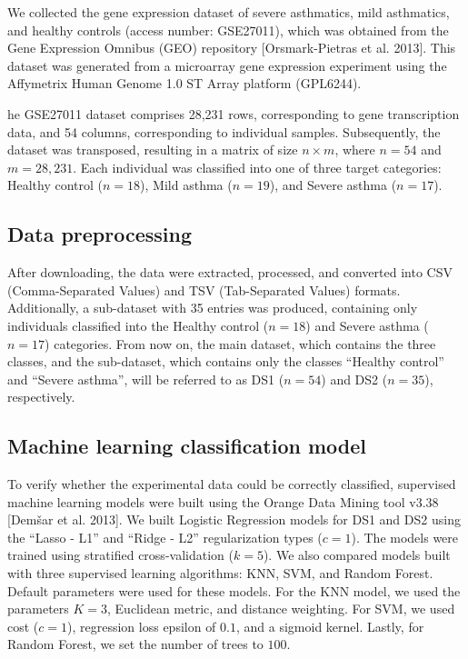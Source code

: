 We collected the gene expression dataset of severe asthmatics, mild asthmatics, and healthy controls (access number: GSE27011), which was obtained from the Gene Expression Omnibus (GEO) repository [Orsmark-Pietras et al. 2013]. This dataset was generated from a microarray gene expression experiment using the Affymetrix Human Genome 1.0 ST Array platform (GPL6244). 

he GSE27011 dataset comprises 28,231 rows, corresponding to gene transcription data, and 54 columns, corresponding to individual samples. Subsequently, the dataset was transposed, resulting in a matrix of size $n \times m$, where $n = 54$ and $m = 28,231$. Each individual was classified into one of three target categories: Healthy control ($n = 18$), Mild asthma ($n = 19$), and Severe asthma ($n = 17$).

\subsection{Data preprocessing}

After downloading, the data were extracted, processed, and converted into CSV (Comma-Separated Values) and TSV (Tab-Separated Values) formats. Additionally, a sub-dataset with 35 entries was produced, containing only individuals classified into the Healthy control ($n = 18$) and Severe asthma ($n = 17$) categories. From now on, the main dataset, which contains the three classes, and the sub-dataset, which contains only the classes ``Healthy control'' and ``Severe asthma'', will be referred to as DS1 ($n = 54$) and DS2 ($n = 35$), respectively.

\subsection{Machine learning classification model}

To verify whether the experimental data could be correctly classified, supervised machine learning models were built using the Orange Data Mining tool v3.38 [Demšar et al. 2013]. We built Logistic Regression models for DS1 and DS2 using the ``Lasso - L1'' and ``Ridge - L2'' regularization types ($c = 1$). The models were trained using stratified cross-validation ($k = 5$). We also compared models built with three supervised learning algorithms: KNN, SVM, and Random Forest. Default parameters were used for these models. For the KNN model, we used the parameters $K = 3$, Euclidean metric, and distance weighting. For SVM, we used cost ($c = 1$), regression loss epsilon of $0.1$, and a sigmoid kernel. Lastly, for Random Forest, we set the number of trees to $100$.

